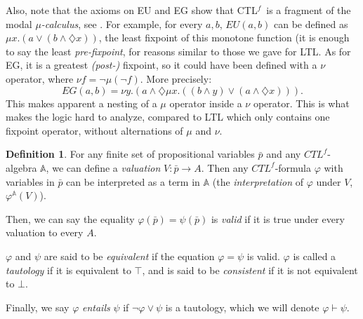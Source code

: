 \documentclass[11pt]{article}
\newcommand{\A}{{\mathbb{A}}}
\newcommand{\CTLf}{{CTL$^f$}}
\newcommand{\dia}{{\diamondsuit}}
\theoremstyle{definition}
\newtheorem{definition}{Definition}
\begin{document}
Also, note that the axioms on EU and EG show that \CTLf~is a fragment of the modal \emph{$\mu$-calculus}, 
see \cite[Section 2]{SantoMu}. For example, for every $a,b$, $EU(a,b)$ can be defined as 
$\mu x.(a \vee (b \wedge \dia x))$, the least fixpoint of this monotone function (it is enough to say the least \emph{pre-fixpoint}, 
for reasons similar to those we gave for LTL. As for EG, it is a greatest \emph{(post-)} fixpoint, 
so it could have been defined with a $\nu$ operator, where $\nu f = \neg\mu(\neg f) $. 
More precisely: \[EG(a,b)=\nu y.(a\wedge\dia\mu x.((b\wedge y)\vee(a\wedge\dia x))).\] 
This makes apparent a nesting of a $\mu$ operator inside a $\nu$ operator. This is what makes the logic hard to analyze, 
compared to LTL which only contains one fixpoint operator, without alternations of $\mu$ and $\nu$.  

\begin{definition}\label{interp_form_algebra}
    For any finite set of propositional variables $\bar{p}$ and any $CTL^f$-algebra $\A$, we can define a \emph{valuation} 
    $V:\bar{p}\to A$. Then any $CTL^f$-formula $\varphi$ with variables in $\bar{p}$ can be interpreted as a term in $\A$ (the \emph{interpretation} of $\varphi$ under $V$, $\varphi^\A(V)$).

    Then, we can say the equality $\varphi(\bar{p})=\psi(\bar{p})$ is \emph{valid} if it is true under every valuation to every $A$.

    $\varphi$ and $\psi $ are said to be \emph{equivalent} if the equation $\varphi = \psi$ is valid. $\varphi$ is called a \emph{tautology} if it is equivalent to $\top$, and is said to be \emph{consistent} if it is not equivalent to $\bot$.

    Finally, we say $\varphi$ \emph{entails} $\psi$ if $\neg \varphi \vee \psi$ is a tautology, which we will denote $\varphi \vdash \psi$.
\end{definition}
\end{document}
